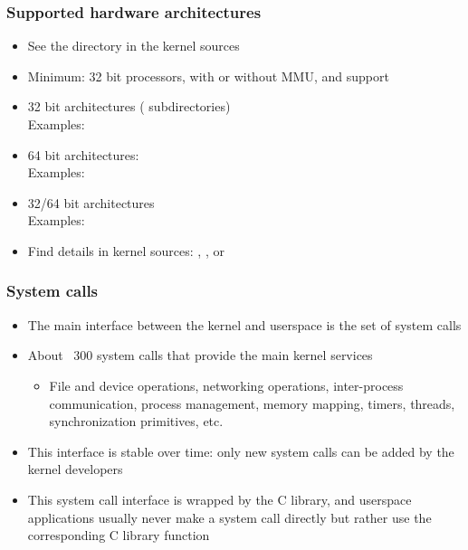 \begin{frame}
  \frametitle{Supported hardware architectures}
  \begin{itemize}
  \item See the  directory in the kernel sources
  \item Minimum: 32 bit processors, with or without MMU, and
     support
  \item 32 bit architectures ( subdirectories)\\
    Examples: 
  \item 64 bit architectures:\\
    Examples: 
  \item 32/64 bit architectures\\
    Examples: 
  \item Find details in kernel sources: ,
    , or 
  \end{itemize}
\end{frame}

\begin{frame}
  \frametitle{System calls}
  \begin{itemize}
  \item The main interface between the kernel and userspace is the set
    of system calls
  \item About ~300 system calls that provide the main kernel services
    \begin{itemize}
    \item File and device operations, networking operations,
      inter-process communication, process management, memory mapping,
      timers, threads, synchronization primitives, etc.
    \end{itemize}
  \item This interface is stable over time: only new system calls can
    be added by the kernel developers
  \item This system call interface is wrapped by the C library, and
    userspace applications usually never make a system call directly
    but rather use the corresponding C library function
  \end{itemize}
\end{frame}

